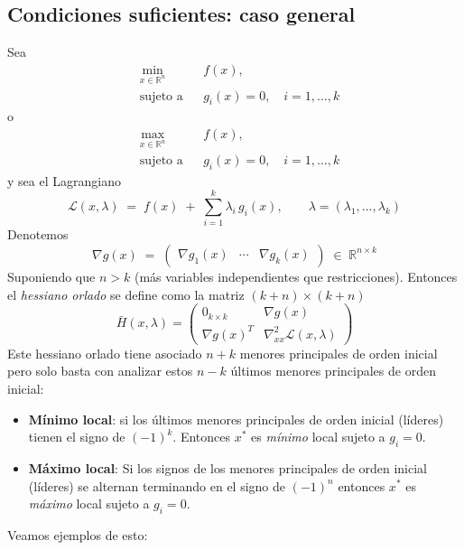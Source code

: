 \documentclass{article}
\newcommand{\R}{\ensuremath{\mathbb{R}}}
\begin{document}
\subsection*{Condiciones suficientes: caso general}

Sea
\[
\begin{aligned}
&\min_{x\in\R^n} && f(x),\\
&\text{sujeto a} && g_i(x)=0,\quad i=1,\dots,k
\end{aligned}\]
o
\\
\[
\begin{aligned}
&\max_{x\in\R^n} && f(x),\\
&\text{sujeto a} && g_i(x)=0,\quad i=1,\dots,k
\end{aligned}
\]
y sea el Lagrangiano
\[
\mathcal L(x,\lambda)
\;=\;
f(x)\;+\;\sum_{i=1}^k\lambda_i\,g_i(x),
\qquad
\lambda=(\lambda_1,\dots,\lambda_k)
\]
Denotemos
\[
\nabla g(x)
\;=\;
\begin{pmatrix}
\nabla g_1(x) & \cdots & \nabla g_k(x)
\end{pmatrix}
\;\in\;\R^{n\times k}
\]
Suponiendo que $n>k$ (más variables independientes que restricciones). Entonces el \emph{hessiano orlado} se define como la matriz  
\((k+n)\times(k+n)\)
\[
\bar{H}(x,\lambda)
=
\begin{pmatrix}
0_{k\times k} & \nabla g(x)\\[6pt]
\nabla g(x)^{T}  & \nabla^2_{xx}\mathcal L(x,\lambda)
\end{pmatrix}
\]
Este hessiano orlado tiene asociado $n+k$ menores principales de orden inicial pero solo basta con analizar estos \(n-k\) últimos menores principales de orden inicial:

\begin{itemize}\color{teal}
  \item \textbf{Mínimo local}: si los últimos menores principales de orden inicial (líderes) tienen el signo de $(-1)^k$. Entonces \(x^*\) es \emph{mínimo} local sujeto a \(g_i=0\).
  \item \textbf{Máximo local}: Si los signos de los menores principales de orden inicial (líderes) se alternan terminando en el signo de $(-1)^n$ entonces \(x^*\) es \emph{máximo} local sujeto a \(g_i=0\).
\end{itemize}

Veamos ejemplos de esto:
\end{document}
